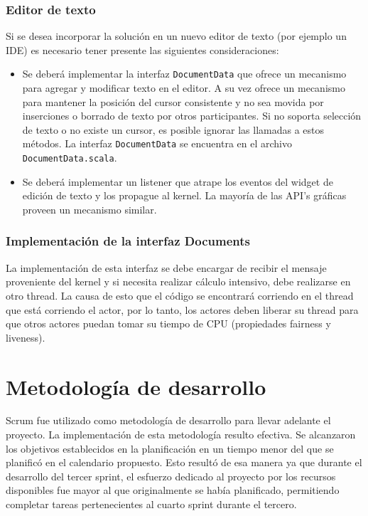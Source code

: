 \documentclass[12pt,a4paper]{article}
\begin{document}
\subsubsection{Editor de texto}
Si se desea incorporar la solución en un nuevo editor de texto (por ejemplo un IDE) es necesario tener presente 
las siguientes consideraciones:

	\begin{itemize}
		\item Se deberá implementar la interfaz \texttt{DocumentData} que ofrece un mecanismo para agregar y modificar texto en el editor. 
		A su vez ofrece un mecanismo para mantener la posición del cursor consistente y no sea movida por inserciones o
		borrado de texto por otros participantes. Si no soporta selección de texto o no existe un cursor, es posible ignorar
		las llamadas a estos métodos.
		La interfaz \texttt{DocumentData} se encuentra en el archivo \texttt{DocumentData.scala}.
		\item  Se deberá implementar un listener que atrape los eventos del widget de edición de texto y los propague al kernel.
		La mayoría de las API’s gráficas proveen un mecanismo similar.
	\end{itemize}


\subsubsection{Implementación de la interfaz Documents}
La implementación de esta interfaz se debe encargar de recibir el mensaje proveniente del kernel y si necesita realizar
cálculo intensivo, debe realizarse en otro thread. La causa de esto que el código se encontrará corriendo en el thread que
está corriendo el actor, por lo tanto, los actores deben liberar su thread para que otros actores puedan tomar su tiempo de CPU
(propiedades fairness y liveness).

\section{Metodología de desarrollo}

Scrum fue utilizado como metodología de desarrollo para llevar adelante el proyecto. La implementación de esta metodología
resulto efectiva. Se alcanzaron los objetivos establecidos en la planificación en un tiempo menor del que se planificó en
el calendario propuesto. Esto resultó de esa manera ya que durante el desarrollo del tercer sprint, el esfuerzo dedicado al proyecto
por los recursos disponibles fue mayor al que originalmente se había planificado, permitiendo completar tareas pertenecientes
al cuarto sprint durante el tercero.
\end{document}
